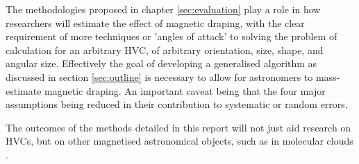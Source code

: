 The methodologies proposed in chapter \ref{sec:evaluation} play a role in how researchers will estimate the effect of magnetic draping, with the clear requirement of more techniques or 'angles of attack' to solving the problem of calculation for an arbitrary HVC, of arbitrary orientation, size, shape, and angular size. Effectively the goal of developing a generalised algorithm as discussed in section \ref{sec:outline} is necessary to allow for astronomers to mass-estimate magnetic draping. An important caveat being that the four major assumptions being reduced in their contribution to systematic or random errors.

The outcomes of the methods detailed in this report will not just aid research on HVCs, but on other magnetised astronomical objects, such as in molecular clouds \citep{ID70}.